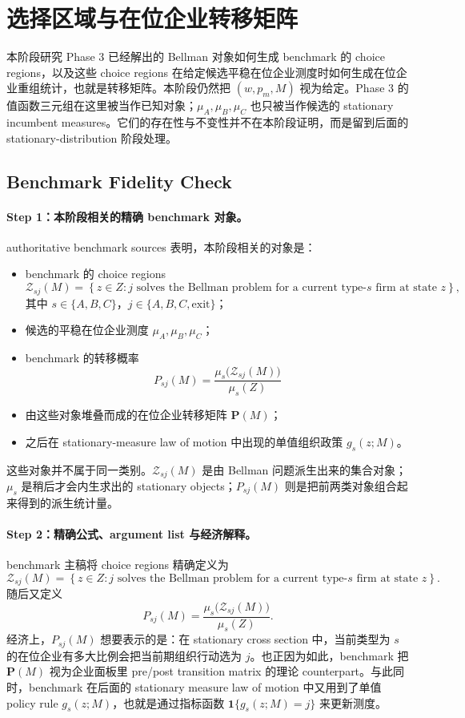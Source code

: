 \section{选择区域与在位企业转移矩阵}

本阶段研究 Phase 3 已经解出的 Bellman 对象如何生成 benchmark 的 choice regions，以及这些 choice regions 在给定候选平稳在位企业测度时如何生成在位企业重组统计，也就是转移矩阵。本阶段仍然把 $(w,p_m,M)$ 视为给定。Phase 3 的值函数三元组在这里被当作已知对象；$\mu_A,\mu_B,\mu_C$ 也只被当作候选的 stationary incumbent measures。它们的存在性与不变性并不在本阶段证明，而是留到后面的 stationary-distribution 阶段处理。

\subsection{Benchmark Fidelity Check}

\paragraph{Step 1：本阶段相关的精确 benchmark 对象。}
authoritative benchmark sources 表明，本阶段相关的对象是：
\begin{itemize}
    \item benchmark 的 choice regions
    \[
    \mathcal Z_{sj}(M)=\left\{z\in Z: j \text{ solves the Bellman problem for a current type-}s\text{ firm at state } z\right\},
    \]
    其中 $s\in\{A,B,C\}$，$j\in\{A,B,C,\mathrm{exit}\}$；
    \item 候选的平稳在位企业测度 $\mu_A,\mu_B,\mu_C$；
    \item benchmark 的转移概率
    \[
    P_{sj}(M)=\frac{\mu_s\bigl(\mathcal Z_{sj}(M)\bigr)}{\mu_s(Z)}
    \]
    \item 由这些对象堆叠而成的在位企业转移矩阵 $\mathbf P(M)$；
    \item 之后在 stationary-measure law of motion 中出现的单值组织政策 $g_s(z;M)$。
\end{itemize}
这些对象并不属于同一类别。$\mathcal Z_{sj}(M)$ 是由 Bellman 问题派生出来的集合对象；$\mu_s$ 是稍后才会内生求出的 stationary objects；$P_{sj}(M)$ 则是把前两类对象组合起来得到的派生统计量。

\paragraph{Step 2：精确公式、argument list 与经济解释。}
benchmark 主稿将 choice regions 精确定义为
\[
\mathcal Z_{sj}(M)=\left\{z\in Z: j \text{ solves the Bellman problem for a current type-}s\text{ firm at state } z\right\}.
\]
随后又定义
\[
P_{sj}(M)=\frac{\mu_s\bigl(\mathcal Z_{sj}(M)\bigr)}{\mu_s(Z)}.
\]
经济上，$P_{sj}(M)$ 想要表示的是：在 stationary cross section 中，当前类型为 $s$ 的在位企业有多大比例会把当前期组织行动选为 $j$。也正因为如此，benchmark 把 $\mathbf P(M)$ 视为企业面板里 pre/post transition matrix 的理论 counterpart。与此同时，benchmark 在后面的 stationary measure law of motion 中又用到了单值 policy rule $g_s(z;M)$，也就是通过指标函数 $\mathbf 1\{g_s(z;M)=j\}$ 来更新测度。

